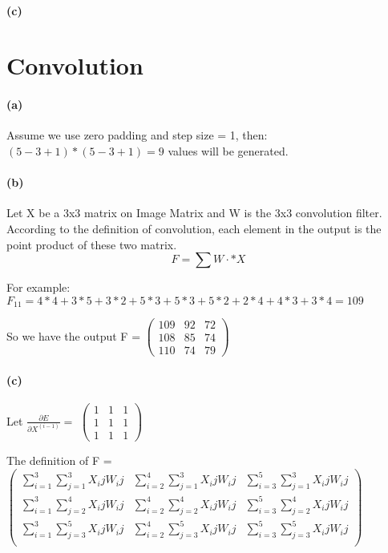 \documentclass{article}
\begin{document}
\paragraph{(c)}

\section{Convolution}

\paragraph{(a)}
Assume we use zero padding and step size = 1, then:
$(5-3+1)*(5-3+1) = 9$ values will be generated.

\paragraph{(b)}
Let X be a 3x3 matrix on Image Matrix and W is the 3x3 convolution filter. \\
According to the definition of convolution, each element in the output is the point product of these two matrix.
\begin{equation}
F = \sum W \cdot \ast X
\end{equation}

For example:
$F_11 = 4*4+3*5+3*2+5*3+5*3+5*2+2*4+4*3+3*4= 109$

So we have the output F =
$\begin{pmatrix}
  109 & 92 & 72 \\
  108 & 85 & 74 \\
  110 & 74 & 79
\end{pmatrix}$

\paragraph{(c)}

Let $\frac{\partial E}{\partial X^(i-1)} = $
$\begin{pmatrix}
  1 & 1 & 1 \\
  1 & 1 & 1 \\
  1 & 1 & 1
\end{pmatrix}$

The definition of F = 
$\begin{pmatrix}
  \sum\limits_{i=1}^{3}\sum\limits_{j=1}^{3} {X_ij W_ij} & \sum\limits_{i=2}^{4}\sum\limits_{j=1}^{3} {X_ij W_ij} & \sum\limits_{i=3}^{5}\sum\limits_{j=1}^{3} {X_ij W_ij} \\
  \sum\limits_{i=1}^{3}\sum\limits_{j=2}^{4} {X_ij W_ij} & \sum\limits_{i=2}^{4}\sum\limits_{j=2}^{4} {X_ij W_ij} & \sum\limits_{i=3}^{5}\sum\limits_{j=2}^{4} {X_ij W_ij} \\
  \sum\limits_{i=1}^{3}\sum\limits_{j=3}^{5} {X_ij W_ij} & \sum\limits_{i=2}^{4}\sum\limits_{j=3}^{5} {X_ij W_ij} & \sum\limits_{i=3}^{5}\sum\limits_{j=3}^{5} {X_ij W_ij} \\
\end{pmatrix}$
\end{document}
